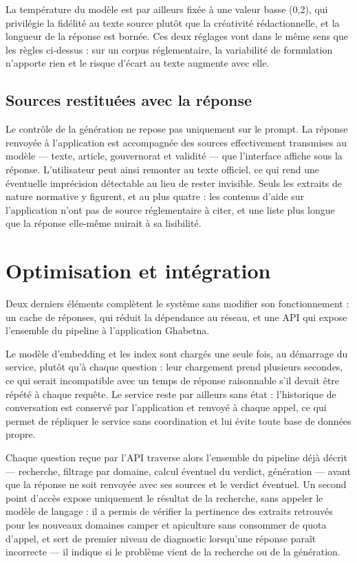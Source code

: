 La température du modèle est par ailleurs fixée à une valeur basse (0,2), qui
privilégie la fidélité au texte source plutôt que la créativité rédactionnelle,
et la longueur de la réponse est bornée. Ces deux réglages vont dans le même sens
que les règles ci-dessus : sur un corpus réglementaire, la variabilité de
formulation n'apporte rien et le risque d'écart au texte augmente avec elle.

\subsection{Sources restituées avec la réponse}

Le contrôle de la génération ne repose pas uniquement sur le prompt. La réponse
renvoyée à l'application est accompagnée des sources effectivement transmises au
modèle — texte, article, gouvernorat et validité — que l'interface affiche sous
la réponse. L'utilisateur peut ainsi remonter au texte officiel, ce qui rend une
éventuelle imprécision détectable au lieu de rester invisible. Seuls les extraits
de nature normative y figurent, et au plus quatre : les contenus d'aide sur
l'application n'ont pas de source réglementaire à citer, et une liste plus longue
que la réponse elle-même nuirait à sa lisibilité.


\section{Optimisation et intégration}
\label{sec:optimisation}

Deux derniers éléments complètent le système sans modifier son fonctionnement :
un cache de réponses, qui réduit la dépendance au réseau, et une API qui expose
l'ensemble du pipeline à l'application Ghabetna.

Le modèle d'embedding et les index sont chargés une seule fois, au démarrage du
service, plutôt qu'à chaque question : leur chargement prend plusieurs secondes,
ce qui serait incompatible avec un temps de réponse raisonnable s'il devait être
répété à chaque requête. Le service reste par ailleurs sans état : l'historique
de conversation est conservé par l'application et renvoyé à chaque appel, ce qui
permet de répliquer le service sans coordination et lui évite toute base de
données propre.

Chaque question reçue par l'API traverse alors l'ensemble du pipeline déjà
décrit — recherche, filtrage par domaine, calcul éventuel du verdict, génération
— avant que la réponse ne soit renvoyée avec ses sources et le verdict éventuel.
Un second point d'accès expose uniquement le résultat de la recherche, sans
appeler le modèle de langage : il a permis de vérifier la pertinence des extraits
retrouvés pour les nouveaux domaines camper et apiculture sans consommer de quota
d'appel, et sert de premier niveau de diagnostic lorsqu'une réponse paraît
incorrecte — il indique si le problème vient de la recherche ou de la génération.


